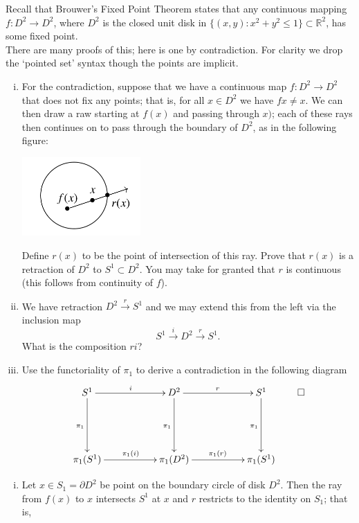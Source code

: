 \begin{problem}
  Recall that Brouwer's Fixed Point Theorem states that any continuous mapping
  \(f: D^2 \to D^2\), where \(D^2\) is the closed unit disk in \(\{(x,y) : x^2 +
  y^2 \leq 1\} \subset \mathbb{R}^2\), has some fixed point.\\

  There are many proofs of this; here is one by contradiction. For clarity we
  drop the `pointed set' syntax though the points are implicit.\\
  \begin{enumerate}[(i)]
    \item For the contradiction, suppose that we have a continuous map \(f: D^2
      \to D^2\) that does not fix any points; that is, for all \(x \in D^2\) we
      have \(fx \not= x\). We can then draw a raw starting at \(f(x)\) and
      passing through \(x)\); each of these rays then continues on to pass
      through the boundary of \(D^2\), as in the following figure:
      \begin{center}
        \includegraphics[height=3cm]{img/brouwer-retraction}
      \end{center}

      Define \(r(x)\) to be the point of intersection of this ray. Prove that
      \(r(x)\) is a retraction of \(D^2\) to \(S^1 \subset D^2\). You may take
      for granted that \(r\) is continuous (this follows from continuity of
      \(f\)).

    \item We have retraction \(D^2 \xrightarrow{r} S^1\) and we may extend this
      from the left via the inclusion map
      \[S^1 \xrightarrow{i} D^2 \xrightarrow{r} S^1.\]
      What is the composition \(ri\)?

    \item Use the functoriality of \(\pi_1\) to derive a contradiction in the
      following diagram
      \begin{equation}\label{eq:brouwer-functoriality-diagram}
        \xymatrix{
          S^1 \ar[rr]^i\ar[dd]_{\pi_1} && D^2 \ar[rr]^r\ar[dd]_{\pi_1} && S^1\ar[dd]_{\pi_1}\\
          & &&&\\
          \pi_1(S^1)\ar[rr]^{\pi_1(i)} && \pi_1(D^2)\ar[rr]^{\pi_1(r)} && \pi_1(S^1)
        }\qed{}
      \end{equation}
  \end{enumerate}
  \begin{Solution}
    \begin{enumerate}[(i)]
      \item Let \(x \in S_1 = \partial D^2\) be point on the boundary circle of
        disk \(D^2\). Then the ray from \(f(x)\) to \(x\) intersects \(S^1\) at
        \(x\) and \(r\) restricts to the identity on \(S_1\); that is,


\end{enumerate}
\end{Solution}
\end{problem}
